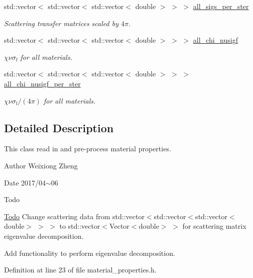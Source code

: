 \begin{DoxyCompactItemize}
std\+::vector$<$ std\+::vector$<$ std\+::vector$<$ double $>$ $>$ $>$ \hyperlink{class_material_properties_a206fc7b81483c3430de643b4dc6598a4}{all\+\_\+sigs\+\_\+per\+\_\+ster}
\begin{DoxyCompactList}\small\item\em Scattering transfer matrices scaled by $4\pi$. \end{DoxyCompactList}\item 
std\+::vector$<$ std\+::vector$<$ std\+::vector$<$ double $>$ $>$ $>$ \hyperlink{class_material_properties_a77cac1147aa82a264d5d7f8782c6bd26}{all\+\_\+chi\+\_\+nusigf}
\begin{DoxyCompactList}\small\item\em $\chi\nu\sigma_\mathrm{f}$ for all materials. \end{DoxyCompactList}\item 
std\+::vector$<$ std\+::vector$<$ std\+::vector$<$ double $>$ $>$ $>$ \hyperlink{class_material_properties_a05f7647f245433d8dd164b8538b868fb}{all\+\_\+chi\+\_\+nusigf\+\_\+per\+\_\+ster}
\begin{DoxyCompactList}\small\item\em $\chi\nu\sigma_\mathrm{f}/(4\pi)$ for all materials. \end{DoxyCompactList}\end{DoxyCompactItemize}


\subsection{Detailed Description}
This class read in and pre-\/process material properties. 

\begin{DoxyAuthor}{Author}
Weixiong Zheng 
\end{DoxyAuthor}
\begin{DoxyDate}{Date}
2017/04$\sim$06
\end{DoxyDate}
\begin{DoxyRefDesc}{Todo}
\item[\hyperlink{todo__todo000007}{Todo}]Change scattering data from std\+::vector$<$std\+::vector$<$std\+::vector$<$double$>$ $>$ $>$ to std\+::vector$<$Vector$<$double$>$ $>$ for scattering matrix eigenvalue decomposition. 

Add functionality to perform eigenvalue decomposition. \end{DoxyRefDesc}


Definition at line 23 of file material\+\_\+properties.\+h.



